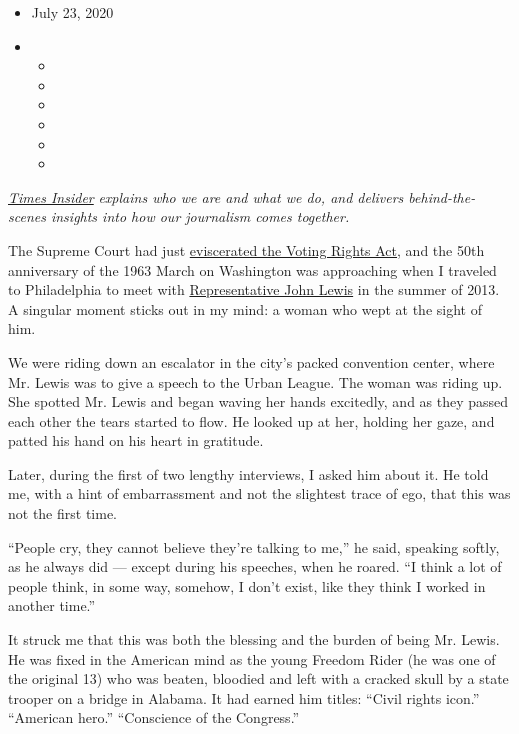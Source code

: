 \begin{itemize}
\item
  July 23, 2020
\item
  \begin{itemize}
  \item
  \item
  \item
  \item
  \item
  \item
  \end{itemize}
\end{itemize}

\href{https://www.nytimes.com/series/times-insider}{\emph{Times
Insider}} \emph{explains who we are and what we do, and delivers
behind-the-scenes insights into how our journalism comes together.}

The Supreme Court had just
\href{https://www.nytimes.com/2013/06/26/us/supreme-court-ruling.html}{eviscerated
the Voting Rights Act}, and the 50th anniversary of the 1963 March on
Washington was approaching when I traveled to Philadelphia to meet with
\href{https://www.nytimes.com/2013/08/14/us/politics/50-years-later-fighting-the-same-civil-rights-battle.html}{Representative
John Lewis} in the summer of 2013. A singular moment sticks out in my
mind: a woman who wept at the sight of him.

We were riding down an escalator in the city's packed convention center,
where Mr. Lewis was to give a speech to the Urban League. The woman was
riding up. She spotted Mr. Lewis and began waving her hands excitedly,
and as they passed each other the tears started to flow. He looked up at
her, holding her gaze, and patted his hand on his heart in gratitude.

Later, during the first of two lengthy interviews, I asked him about it.
He told me, with a hint of embarrassment and not the slightest trace of
ego, that this was not the first time.

``People cry, they cannot believe they're talking to me,'' he said,
speaking softly, as he always did --- except during his speeches, when
he roared. ``I think a lot of people think, in some way, somehow, I
don't exist, like they think I worked in another time.''

It struck me that this was both the blessing and the burden of being Mr.
Lewis. He was fixed in the American mind as the young Freedom Rider (he
was one of the original 13) who was beaten, bloodied and left with a
cracked skull by a state trooper on a bridge in Alabama. It had earned
him titles: ``Civil rights icon.'' ``American hero.'' ``Conscience of
the Congress.''

